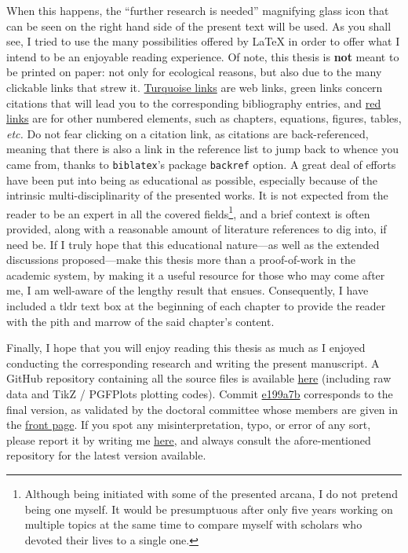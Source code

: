 \mfrin{}When this happens, the \enquote{further research is needed} magnifying glass icon that can be seen on the right hand side of the present text will be used. As you shall see, I tried to use the many possibilities offered by \LaTeX{} in order to offer what I intend to be an enjoyable reading experience. Of note, this thesis is \textbf{not} meant to be printed on paper: not only for ecological reasons, but also due to the many clickable links that strew it. \href{https://archive.org/details/lshort}{Turquoise links} are web links, green links\cite{oetiker2007} concern citations that will lead you to the corresponding bibliography entries, and \hyperlink{forechap:foreword}{red links} are for other numbered elements, such as chapters, equations, figures, tables, \emph{etc.} Do not fear clicking on a citation link, as citations are back-referenced, meaning that there is also a link in the reference list to jump back to whence you came from, thanks to \texttt{biblatex}'s package \texttt{backref} option.
\clearpage
A great deal of efforts have been put into being as educational as possible, especially because of the intrinsic multi-disciplinarity of the presented works. It is not expected from the reader to be an expert in all the covered fields\footnote{Although being initiated with some of the presented arcana, I do not pretend being one myself. It would be presumptuous after only five years working on multiple topics at the same time to compare myself with scholars who devoted their lives to a single one.}, and a brief context is often provided, along with a reasonable amount of literature references to dig into, if need be. If I truly hope that this educational nature---as well as the extended discussions proposed---make this thesis more than a proof-of-work in the academic system, \ie{} by making it a useful resource for those who may come after me, I am well-aware of the lengthy result that ensues. Consequently, I have included a \gls{tldr} text box at the beginning of each chapter to provide the reader with the pith and marrow of the said chapter's content.

Finally, I hope that you will enjoy reading this thesis as much as I enjoyed conducting the corresponding research and writing the present manuscript. A GitHub repository containing all the source files is available \href{https://github.com/e-dervieux/phd_thesis}{here} (including raw data and TikZ / PGFPlots plotting codes). Commit \href{https://github.com/e-dervieux/phd_thesis/commit/e199a7bdf505e4a80ddf6542e9dfe2d8b4e7efa7}{e199a7b} corresponds to the final version, as validated by the doctoral committee whose members are given in the \hyperlink{page.1}{front page}. If you spot any misinterpretation, typo, or error of any sort, please report it by writing me  \href{mailto:emmanuel.dervieux@gmail.com}{here}, and always consult the afore-mentioned repository for the latest version available.

